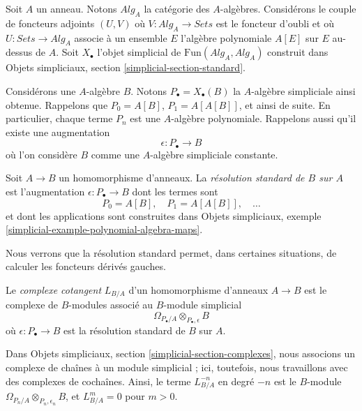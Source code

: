 \noindent
Soit $A$ un anneau. Notons $\textit{Alg}_A$ la catégorie des $A$-algèbres.
Considérons le couple de foncteurs adjoints $(U, V)$ où
$V : \textit{Alg}_A \to \textit{Sets}$ est le foncteur d'oubli et où
$U : \textit{Sets} \to \textit{Alg}_A$ associe à un ensemble $E$ l'algèbre
polynomiale $A[E]$ sur $E$ au-dessus de $A$. Soit $X_\bullet$ l'objet
simplicial de $\text{Fun}(\textit{Alg}_A, \textit{Alg}_A)$ construit dans
Objets simpliciaux, section \ref{simplicial-section-standard}.

\medskip\noindent
Considérons une $A$-algèbre $B$. Notons $P_\bullet = X_\bullet(B)$ la
$A$-algèbre simpliciale ainsi obtenue. Rappelons que $P_0 = A[B]$,
$P_1 = A[A[B]]$, et ainsi de suite. En particulier, chaque terme $P_n$ est
une $A$-algèbre polynomiale. Rappelons aussi qu'il existe une augmentation
$$
\epsilon : P_\bullet \longrightarrow B
$$
où l'on considère $B$ comme une $A$-algèbre simpliciale constante.

\begin{definition}
\label{definition-standard-resolution}
Soit $A \to B$ un homomorphisme d'anneaux. La {\it résolution standard de
$B$ sur $A$} est l'augmentation $\epsilon : P_\bullet \to B$ dont les termes
sont
$$
P_0 = A[B],\quad P_1 = A[A[B]],\quad \ldots
$$
et dont les applications sont construites dans Objets simpliciaux, exemple
\ref{simplicial-example-polynomial-algebra-maps}.
\end{definition}

\noindent
Nous verrons que la résolution standard permet, dans certaines situations,
de calculer les foncteurs dérivés gauches.

\begin{definition}
\label{definition-cotangent-complex-ring-map}
Le {\it complexe cotangent} $L_{B/A}$ d'un homomorphisme d'anneaux $A \to B$
est le complexe de $B$-modules associé au $B$-module simplicial
$$
\Omega_{P_\bullet/A} \otimes_{P_\bullet, \epsilon} B
$$
où $\epsilon : P_\bullet \to B$ est la résolution standard de $B$ sur $A$.
\end{definition}

\noindent
Dans Objets simpliciaux, section \ref{simplicial-section-complexes}, nous
associons un complexe de chaînes à un module simplicial ; ici, toutefois, nous
travaillons avec des complexes de cochaînes. Ainsi, le terme $L_{B/A}^{-n}$
en degré $-n$ est le $B$-module
$\Omega_{P_n/A} \otimes_{P_n, \epsilon_n} B$, et $L_{B/A}^m = 0$ pour
$m > 0$.

